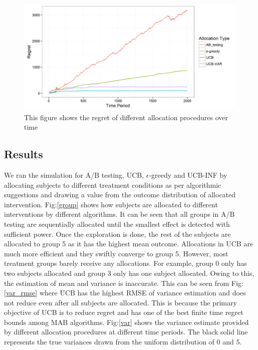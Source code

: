 \documentclass[12pt, letterpaper]{article}
\begin{document}
\begin{figure}
  \centering
    \includegraphics[width=\textwidth]{figs/regret.png}
      \caption{This figure shows the regret of different allocation procedures over time}
      \label{regret}
\end{figure}


\subsection*{Results}

We ran the simulation for A/B testing, UCB, $\epsilon$-greedy and UCB-INF by allocating subjects to different treatment conditions as per algorithmic suggestions and drawing a value from the outcome distribution of allocated intervention. Fig:\ref{group} shows how subjects are allocated to different interventions by different algorithms. It can be seen that all groups in A/B testing are sequentially allocated until the smallest effect is detected with sufficient power. Once the exploration is done, the rest of the subjects are allocated to group 5 as it has the highest mean outcome. Allocations in UCB are much more efficient and they swiftly converge to group 5. However, most treatment groups barely receive any allocations. For example, group 0 only has two subjects allocated and group 3 only has one subject allocated.  Owing to this, the estimation of mean and variance is inaccurate. This can be seen from Fig:\ref{var_rmse} where UCB has the highest RMSE of variance estimation and does not reduce even after all subjects are allocated. This is because the primary objective of UCB is to reduce regret and has one of the best finite time regret bounds among MAB algorithms. Fig:\ref{var} shows the variance estimate provided by different allocation procedures at different time periods. The black solid line represents the true variances drawn from the uniform distribution of 0 and 5. 
\end{document}
